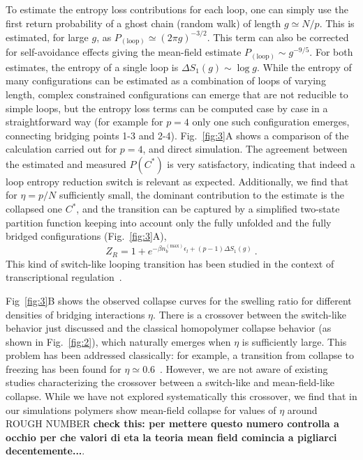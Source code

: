 \documentclass[a4paper,12pt,pre,superscriptaddress]{revtex4}
\begin{document}
To estimate the entropy loss contributions for each loop, one can
simply use the first return probability of a ghost chain (random walk)
of length $g\simeq N/p$. This is estimated, for large $g$, as
$P_\mathrm{(loop)}\simeq (2\pi g)^{-3/2}$. This term can also be
corrected for self-avoidance effects giving the mean-field estimate
$P_\mathrm{(loop)}\sim g^{-9/5}$. For both estimates, the entropy of a
single loop is $\Delta S_1(g) \sim \log g$. 
%
While the entropy of many configurations can be estimated as a
combination of loops of varying length, complex constrained
configurations can emerge that are not reducible to simple loops, but
the entropy loss terms can be computed case by case in a
straightforward way (for example for $p=4$ only one such configuration
emerges, connecting bridging points 1-3 and 2-4).  Fig.~\ref{fig:3}A
shows a comparison of the calculation carried out for $p=4$, and
direct simulation.  The agreement between the estimated and measured
$P(C^*)$ is very satisfactory, indicating that indeed a loop entropy
reduction switch is relevant as expected.
%
Additionally, we find that for $\eta=p/N$ sufficiently small, the
dominant contribution to the estimate is the collapsed one $C^*$, and
the transition can be captured by a simplified two-state partition
function keeping into account only the fully unfolded and the fully
bridged configurations (Fig.~\ref{fig:3}A),
\begin{equation}
  Z_R = 1 +  e^{-\beta n_b^{\mathrm{(max)}} \epsilon_l + (p-1) \Delta S_1(g)} \ .
  \label{eq:Zloop_red}
\end{equation}
This kind of switch-like looping transition has been studied in the
context of transcriptional regulation~\cite{Saiz2006a}.

%
Fig~\ref{fig:3}B shows the observed collapse curves for the swelling
ratio for different densities of bridging interactions $\eta$. There
is a crossover between the switch-like behavior just discussed and the
classical homopolymer collapse behavior (as shown in
Fig.~\ref{fig:2}), which naturally emerges when $\eta$ is sufficiently
large. This problem has been addressed classically: for example, a
transition from collapse to freezing has been found for $\eta \simeq
0.6$~\cite{Camacho1997}. However, we are not aware of existing studies
characterizing the crossover between a switch-like and mean-field-like
collapse. While we have not explored systematically this crossover, we
find that in our simulations polymers show mean-field collapse for
values of $\eta$ around ROUGH NUMBER \textbf{check this: per mettere questo
  numero controlla a occhio per che valori di eta la teoria mean field
  comincia a pigliarci decentemente...}.
\end{document}
